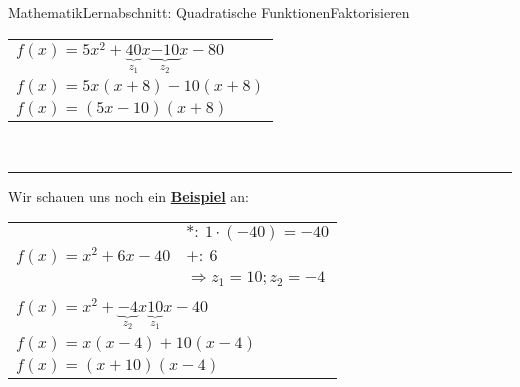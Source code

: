 \documentclass[11pt,twocolumn,oneside,openany,headings=optiontotoc,11pt,numbers=noenddot]{article}
\begin{document}
\begin{worksheet}{Mathematik}{Lernabschnitt: Quadratische Funktionen}{Faktorisieren}
\begin{tabularx}{0.5\textwidth}{X|l}
			\multicolumn{2}{l}{\(f(x) = 5x^2 + \underbrace{40}_{z_1}x \underbrace{-10}_{z_2}x -80\)}\\
			\multicolumn{2}{l}{\(f(x) = 5x(x+8) -10(x+8)\)}\\
			\multicolumn{2}{l}{\(f(x) = (5x-10)(x+8)\)}
		\end{tabularx}\\
		\par\noindent
		\rule{0.45\textwidth}{0.1pt}
		Wir schauen uns noch ein \underline{\textbf{Beispiel}} an:\\
		\par\noindent
		\begin{tabularx}{0.5\textwidth}{X|l}
			\cline{2-2}
			& \(*:\ 1\cdot(-40)=-40\)\\
			\(f(x) = x^2 + 6x - 40\) & \(+:\ 6\)\\
			& \(\Rightarrow z_1 = 10; z_2 = -4\)\\
			\cline{2-2}
			\multicolumn{2}{l}{}\\
			\multicolumn{2}{l}{\(f(x) = x^2 + \underbrace{-4}_{z_2}x \underbrace{10}_{z_1}x - 40\)}\\
			\multicolumn{2}{l}{\(f(x) = x(x-4) + 10(x-4)\)}\\
			\multicolumn{2}{l}{\(f(x) = (x+10)(x-4)\)}
		\end{tabularx}

\end{worksheet}
\end{document}
